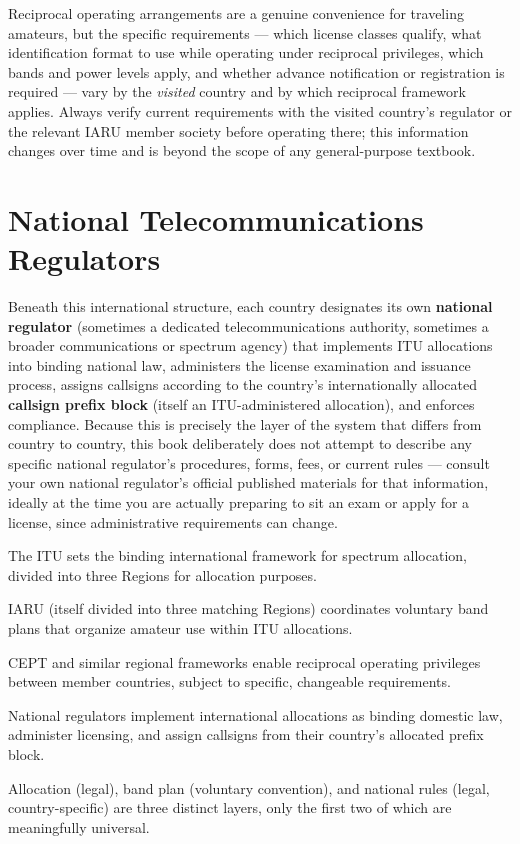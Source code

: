 \begin{examtip}
Reciprocal operating arrangements are a genuine convenience for
traveling amateurs, but the specific requirements --- which license
classes qualify, what identification format to use while operating
under reciprocal privileges, which bands and power levels apply, and
whether advance notification or registration is required --- vary by
the \emph{visited} country and by which reciprocal framework applies.
Always verify current requirements with the visited country's regulator
or the relevant IARU member society before operating there; this
information changes over time and is beyond the scope of any
general-purpose textbook.
\end{examtip}

\section{National Telecommunications Regulators}

Beneath this international structure, each country designates its own
\textbf{national regulator} (sometimes a dedicated telecommunications
authority, sometimes a broader communications or spectrum agency) that
implements ITU allocations into binding national law, administers the
license examination and issuance process, assigns callsigns according
to the country's internationally allocated \textbf{callsign prefix
block} (itself an ITU-administered allocation), and enforces compliance.
Because this is precisely the layer of the system that differs from
country to country, this book deliberately does not attempt to describe
any specific national regulator's procedures, forms, fees, or current
rules --- consult your own national regulator's official published
materials for that information, ideally at the time you are actually
preparing to sit an exam or apply for a license, since administrative
requirements can change.

\begin{quickreview}
\item The ITU sets the binding international framework for spectrum
allocation, divided into three Regions for allocation purposes.
\item IARU (itself divided into three matching Regions) coordinates
voluntary band plans that organize amateur use within ITU allocations.
\item CEPT and similar regional frameworks enable reciprocal operating
privileges between member countries, subject to specific, changeable
requirements.
\item National regulators implement international allocations as
binding domestic law, administer licensing, and assign callsigns from
their country's allocated prefix block.
\item Allocation (legal), band plan (voluntary convention), and
national rules (legal, country-specific) are three distinct layers,
only the first two of which are meaningfully universal.
\end{quickreview}

